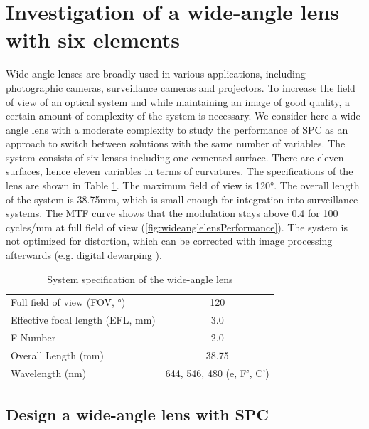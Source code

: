 \section{Investigation of a wide-angle lens with six elements}
Wide-angle lenses are broadly used in various applications, including photographic cameras, surveillance cameras and projectors. To increase the field of view of an optical system and while maintaining an image of good quality, a certain amount of complexity of the system is necessary. We consider here a wide-angle lens with a moderate complexity to study the performance of SPC as an approach to switch between solutions with the same number of variables. The system consists of six lenses including one cemented surface. There are eleven surfaces, hence eleven variables in terms of curvatures. The specifications of the lens are shown in Table \ref{table: sysspecWAL}. The maximum field of view is 120°. The overall length of the system is 38.75mm, which is small enough for integration into surveillance systems. The MTF curve shows that the modulation stays above 0.4 for 100 cycles/mm at full field of view (\ref{fig:wideanglelensPerformance}). The system is not optimized for distortion, which can be corrected with image processing afterwards (e.g. digital dewarping \cite{Sahin:18DisCorrec}).



\setlength{\arrayrulewidth}{.5mm}
\setlength{\tabcolsep}{18pt}
\renewcommand{\arraystretch}{1.2}
\begin{table}[h!]
    \centering
    \captionsetup{justification=centering}
    \caption{System specification of the wide-angle lens}
    \label{table: sysspecWAL}
    \vspace{-1em}
    \begin{tabular}{ p{20em} c }
    \hline 
    Full field of view (FOV, °) & 120\\
    Effective focal length (EFL, mm) & 3.0\\
    F Number & 2.0\\
    Overall Length (mm) & 38.75\\
    Wavelength (nm) & 644, 546, 480 (e, F', C')\\
    \hline
    \end{tabular}
\end{table}

\subsection{Design a wide-angle lens with SPC}

